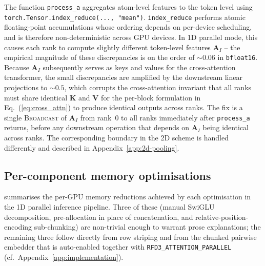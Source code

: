\documentclass{article}
\theoremstyle{plain}
\theoremstyle{definition}
\theoremstyle{remark}
\begin{document}
The function \texttt{process\_a} aggregates atom-level features to the token level using \texttt{torch.Tensor.index\_reduce(..., "mean")}. \texttt{index\_reduce} performs atomic floating-point accumulations whose ordering depends on per-device scheduling, and is therefore non-deterministic across GPU devices. In 1D parallel mode, this causes each rank to compute slightly different token-level features $\mathbf{A}_I$ -- the empirical magnitude of these discrepancies is on the order of ${\sim}0.06$ in \texttt{bfloat16}. Because $\mathbf{A}_I$ subsequently serves as keys and values for the cross-attention transformer, the small discrepancies are amplified by the downstream linear projections to ${\sim}0.5$, which corrupts the cross-attention invariant that all ranks must share identical $\mathbf{K}$ and $\mathbf{V}$ for the per-block formulation in Eq.~(\ref{eq:cross_attn}) to produce identical outputs across ranks. The fix is a single \textsc{Broadcast} of $\mathbf{A}_I$ from rank~$0$ to all ranks immediately after \texttt{process\_a} returns, before any downstream operation that depends on $\mathbf{A}_I$ being identical across ranks. The corresponding boundary in the 2D scheme is handled differently and described in Appendix~\ref{app:2d-pooling}.

\subsection{Per-component memory optimisations}
\label{app:memory}

 summarises the per-GPU memory reductions achieved by each optimisation in the 1D parallel inference pipeline. Three of these (manual SwiGLU decomposition, pre-allocation in place of concatenation, and relative-position-encoding sub-chunking) are non-trivial enough to warrant prose explanations; the remaining three follow directly from row striping and from the chunked pairwise embedder that is auto-enabled together with \texttt{RFD3\_ATTENTION\_PARALLEL} (cf.\ Appendix~\ref{app:implementation}).
\end{document}

